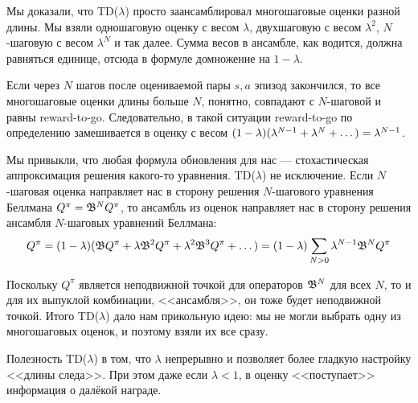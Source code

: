Мы доказали, что TD($\lambda$) просто заансамблировал многошаговые оценки разной длины. Мы взяли одношаговую оценку с весом $\lambda$, двухшаговую с весом $\lambda^2$, $N$-шаговую с весом $\lambda^N$ и так далее. Сумма весов в ансамбле, как водится, должна равняться единице, отсюда в формуле домножение на $1 - \lambda$.

Если через $N$ шагов после оцениваемой пары $s, a$ эпизод закончился, то все многошаговые оценки длины больше $N$, понятно, совпадают с $N$-шаговой и равны reward-to-go. Следовательно, в такой ситуации reward-to-go по определению замешивается в оценку с весом $(1 - \lambda)(\lambda^{N-1} + \lambda^{N} + \dots) \HM= \lambda^{N-1}$.

Мы привыкли, что любая формула обновления для нас --- стохастическая аппроксимация решения какого-то уравнения. TD($\lambda$) не исключение. Если $N$-шаговая оценка направляет нас в сторону решения $N$-шагового уравнения Беллмана $Q^{\pi} \HM= \B^N Q^{\pi}$, то ансамбль из оценок направляет нас в сторону решения ансамбля $N$-шаговых уравнений Беллмана:
$$Q^{\pi} = (1 - \lambda)(\mathfrak{B} Q^{\pi} + \lambda \mathfrak{B}^2 Q^{\pi} + \lambda^2 \mathfrak{B}^3 Q^{\pi} + \dots ) = (1 - \lambda) \sum_{N > 0} \lambda^{N-1} \mathfrak{B}^N Q^{\pi}$$

Поскольку $Q^{\pi}$ является неподвижной точкой для операторов $\mathfrak{B}^N$ для всех $N$, то и для их выпуклой комбинации, <<ансамбля>>, он тоже будет неподвижной точкой. Итого TD($\lambda$) дало нам прикольную идею: мы не могли выбрать одну из многошаговых оценок, и поэтому взяли их все сразу.

\begin{remark}
Полезность TD($\lambda$) в том, что $\lambda$ непрерывно и позволяет более гладкую настройку <<длины следа>>. При этом даже если $\lambda < 1$, в оценку <<поступает>> информация о далёкой награде.
\end{remark}